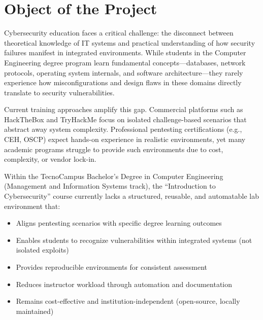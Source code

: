 
\chapter{Object of the Project}


Cybersecurity education faces a critical challenge: the disconnect between 
theoretical knowledge of IT systems and practical understanding of how 
security failures manifest in integrated environments. While students in 
the Computer Engineering degree program learn fundamental concepts---databases, 
network protocols, operating system internals, and software architecture---they 
rarely experience how misconfigurations and design flaws in these domains 
directly translate to security vulnerabilities.

Current training approaches amplify this gap. Commercial platforms such as 
HackTheBox and TryHackMe focus on isolated challenge-based scenarios that 
abstract away system complexity. Professional pentesting certifications 
(e.g., CEH, OSCP\cite{ceh_framework, oscp_exam}) expect hands-on experience in realistic environments, yet 
many academic programs struggle to provide such environments due to cost, 
complexity, or vendor lock-in.

Within the TecnoCampus Bachelor's Degree in Computer Engineering 
(Management and Information Systems track), the ``Introduction to Cybersecurity'' 
course currently lacks a structured, reusable, and automatable lab environment that:

\begin{itemize}
    \item Aligns pentesting scenarios with specific degree learning outcomes
    \item Enables students to recognize vulnerabilities within integrated systems 
          (not isolated exploits)
    \item Provides reproducible environments for consistent assessment
    \item Reduces instructor workload through automation and documentation
    \item Remains cost-effective and institution-independent (open-source, 
          locally maintained)
\end{itemize}

